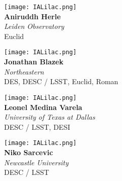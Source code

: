 \documentclass[12pt,letterpaper]{article}
\begin{document}
\begin{multicols}{2}
    \begin{minipage}[t][2in][c]{.45\textwidth}
    \centering
    \texttt{[image: IALilac.png]}\\ \vspace{.5cm}
    \Huge \textbf{Aniruddh Herle}\\
    \vspace{0.5cm}
    \Large \textit{Leiden Observatory} \\
    \vspace{0.5cm}
    \small Euclid
    \end{minipage}
    \vspace{1cm}
    
    \begin{minipage}[t][2in][c]{.45\textwidth}
    \centering
    \texttt{[image: IALilac.png]}\\ \vspace{.5cm}
    \Huge \textbf{Jonathan Blazek}\\
    \vspace{0.5cm}
    \Large \textit{Northeastern} \\
    \vspace{0.5cm}
    \small DES, DESC / LSST, Euclid, Roman
    \end{minipage}
    \vspace{1cm}
    
    \begin{minipage}[t][2in][c]{.45\textwidth}
    \centering
    \texttt{[image: IALilac.png]}\\ \vspace{.5cm}
    \LARGE \textbf{Leonel Medina Varela}\\
    \vspace{0.5cm}
    \Large \textit{University of Texas at Dallas} \\
    \vspace{0.5cm}
    \small DESC / LSST, DESI
    \end{minipage}
    \vspace{1cm}
    
    \begin{minipage}[t][2in][c]{.45\textwidth}
    \centering
    \texttt{[image: IALilac.png]}\\ \vspace{.5cm}
    \Huge \textbf{Niko Sarcevic}\\
    \vspace{0.5cm}
    \Large \textit{Newcastle University} \\
    \vspace{0.5cm}
    \small DESC / LSST
    \end{minipage}
    \vspace{1cm}


\end{multicols}
\end{document}
